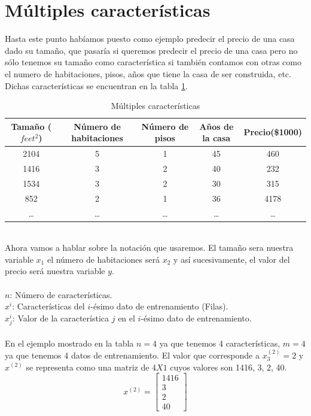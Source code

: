\documentclass{book}
\begin{document}
\section{Múltiples características}
Hasta este punto habíamos puesto como ejemplo predecir el precio de una casa dado su tamaño, que pasaría si queremos predecir el precio de una casa pero no sólo tenemos su tamaño como característica si también contamos con otras como el numero de habitaciones, pisos, años que tiene la casa de ser construida, etc. Dichas características se encuentran en la tabla \ref{Tab:Multi}.
\begin{table}[h]
		\begin{tabular}{|c|c|c|c||c|}
			\hline
			Tamaño ($feet^2$) & Número de habitaciones & Número de pisos&Años de la casa&Precio(\$1000)\\
			\hline
			\hline
			2104&5&1&45&460\\
			1416&3&2&40&232\\
			1534&3&2&30&315\\
			852&2&1&36&4178\\
			\dots&\dots&\dots&\dots&\dots\\		
			\hline	
		\end{tabular}
	\caption{Múltiples características}
	\label{Tab:Multi}
\end{table}
\\Ahora vamos a hablar sobre la notación que usaremos. El tamaño sera nuestra variable $x_1$ el número de habitaciones será $x_2$ y así sucesivamente, el valor del precio será nuestra variable $y$.\\\\
\textbf{\textit{$n$}}: Número de características.\\
\textbf{\textit{$x^{i}$}}: Características del $i$-ésimo dato de entrenamiento (Filas).\\
\textbf{\textit{$x^{i}_j$}}: Valor de la característica $j$ en el $i$-ésimo dato de entrenamiento.\\\\
En el ejemplo mostrado en la tabla $n=4$ ya que tenemos 4 características, $m=4$ ya que tenemos 4 datos de entrenamiento. El valor que corresponde a $ x_3^{(2)}=2$ y $x^{(2)}$ se representa como una matriz de $4X1$ cuyos valores son 1416, 3, 2, 40.
\[x^{(2)}=\left[
\begin{array}{c}
	1416\\3\\2\\40
\end{array}
\right]
\]
\end{document}

